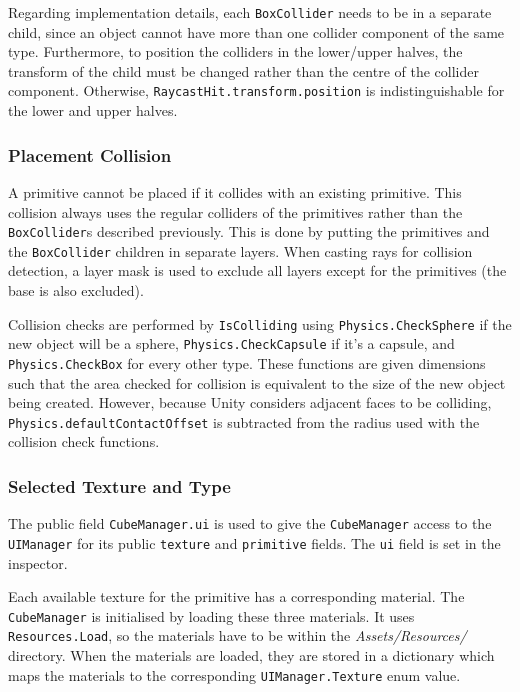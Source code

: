 \documentclass[a4paper, 12pt]{scrartcl}
\begin{document}
Regarding implementation details, each \texttt{BoxCollider} needs to be in a separate child, since an object cannot have more than one collider component of the same type. Furthermore, to position the colliders in the lower/upper halves, the transform of the child must be changed rather than the centre of the collider component. Otherwise, \texttt{RaycastHit.transform.position} is indistinguishable for the lower and upper halves.

\subsubsection{Placement Collision}
A primitive cannot be placed if it collides with an existing primitive. This collision always uses the regular colliders of the primitives rather than the \texttt{BoxCollider}s described previously. This is done by putting the primitives and the \texttt{BoxCollider} children in separate layers. When casting rays for collision detection, a layer mask is used to exclude all layers except for the primitives (the base is also excluded).

Collision checks are performed by \texttt{IsColliding} using \texttt{Physics.CheckSphere} if the new object will be a sphere, \texttt{Physics.CheckCapsule} if it's a capsule, and \texttt{Physics.CheckBox} for every other type. These functions are given dimensions such that the area checked for collision is equivalent to the size of the new object being created. However, because Unity considers adjacent faces to be colliding, \texttt{Physics.defaultContactOffset} is subtracted from the radius used with the collision check functions.

\subsubsection{Selected Texture and Type}
The public field \texttt{CubeManager.ui} is used to give the \texttt{CubeManager} access to the \texttt{UIManager} for its public \texttt{texture} and \texttt{primitive} fields. The \texttt{ui} field is set in the inspector.

Each available texture for the primitive has a corresponding material. The \texttt{CubeManager} is initialised by loading these three materials. It uses \texttt{Resources.Load}, so the materials have to be within the \textit{Assets/Resources/} directory. When the materials are loaded, they are stored in a dictionary which maps the materials to the corresponding \texttt{UIManager.Texture} enum value.
\end{document}
